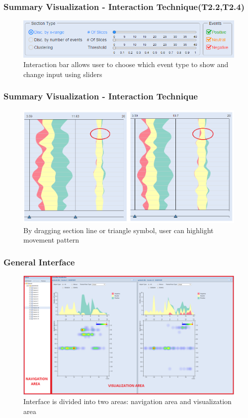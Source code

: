 \documentclass{beamer}
\begin{document}
\begin{frame}
\frametitle{Summary Visualization - Interaction Technique(T2.2,T2.4)}
\begin{figure}
\includegraphics[scale=0.6]{images/interaction_bar.png}
\caption{Interaction bar allows user to choose which event type to show and change input using sliders}
\end{figure}
\end{frame}

\begin{frame}
\frametitle{Summary Visualization - Interaction Technique}
\begin{figure}
\includegraphics[scale=0.4]{images/line_dragging.png}
\caption{By dragging section line or triangle symbol, user can highlight movement pattern }
\end{figure}
\end{frame}
\begin{frame}
\frametitle{General Interface}
\begin{figure}
\includegraphics[scale=0.2]{images/interface_app_compare.png}
\caption{Interface is divided into two areas: navigation area and visualization area}
\end{figure}
\end{frame}
\end{document}
